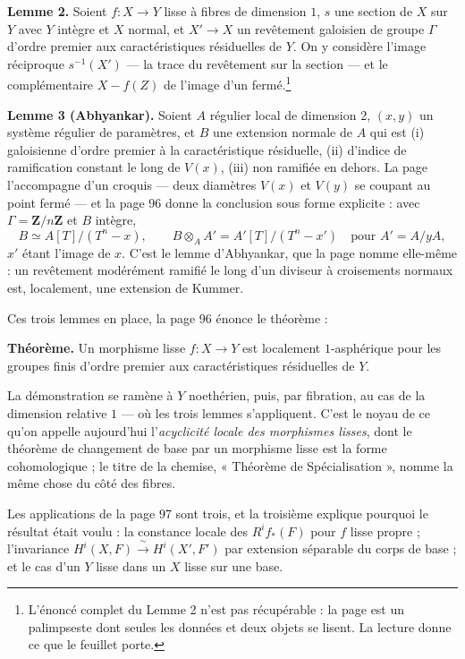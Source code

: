 \documentclass[11pt,a4paper]{article}
\begin{document}
\textbf{Lemme 2.} Soient $f : X \to Y$ lisse à fibres de dimension $1$, $s$ une
section de $X$ sur $Y$ avec $Y$ intègre et $X$ normal, et $X' \to X$ un
revêtement galoisien de groupe $\Gamma$ d'ordre premier aux caractéristiques
résiduelles de $Y$. On y considère l'image réciproque $s^{-1}(X')$ — la trace du
revêtement sur la section — et le complémentaire $X - f(Z)$ de l'image d'un
fermé.\footnote{L'énoncé complet du Lemme 2 n'est pas récupérable : la page est
un palimpseste dont seules les données et deux objets se lisent. La lecture
donne ce que le feuillet porte.}

\textbf{Lemme 3 (Abhyankar).} Soient $A$ régulier local de dimension $2$,
$(x,y)$ un système régulier de paramètres, et $B$ une extension normale de $A$
qui est (i) galoisienne d'ordre premier à la caractéristique résiduelle, (ii)
d'indice de ramification constant le long de $V(x)$, (iii) non ramifiée en
dehors. La page l'accompagne d'un croquis — deux diamètres $V(x)$ et $V(y)$ se
coupant au point fermé — et la page 96 donne la conclusion sous forme
explicite : avec $\Gamma = \mathbf{Z}/n\mathbf{Z}$ et $B$ intègre,
\[
B \simeq A[T]/(T^n - x), \qquad
B \otimes_A A' = A'[T]/(T^n - x') \quad \text{pour } A' = A/yA,
\]
$x'$ étant l'image de $x$. C'est le lemme d'Abhyankar, que la page nomme
elle-même : un revêtement modérément ramifié le long d'un diviseur à
croisements normaux est, localement, une extension de Kummer.

Ces trois lemmes en place, la page 96 énonce le théorème :

\textbf{Théorème.} Un morphisme lisse $f : X \to Y$ est localement
$1$-asphérique pour les groupes finis d'ordre premier aux caractéristiques
résiduelles de $Y$.

La démonstration se ramène à $Y$ noethérien, puis, par fibration, au cas de la
dimension relative $1$ — où les trois lemmes s'appliquent. C'est le noyau de ce
qu'on appelle aujourd'hui l'\emph{acyclicité locale des morphismes lisses}, dont
le théorème de changement de base par un morphisme lisse est la forme
cohomologique ; le titre de la chemise, « Théorème de Spécialisation », nomme la
même chose du côté des fibres.

Les applications de la page 97 sont trois, et la troisième explique pourquoi le
résultat était voulu : la constance locale des $R^i f_{*}(F)$ pour $f$ lisse
propre ; l'invariance $H^i(X,F) \xrightarrow{\ \sim\ } H^i(X',F')$ par extension
séparable du corps de base ; et le cas d'un $Y$ lisse dans un $X$ lisse sur une
base.
\end{document}
